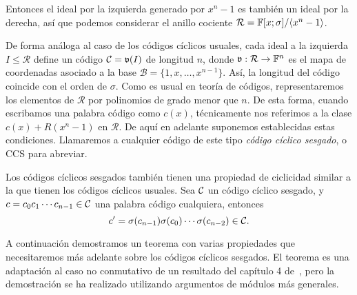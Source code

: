 Entonces el ideal por la izquierda generado por \(x^{n} - 1\) es también un ideal por la derecha, así que podemos considerar el anillo cociente \(\mathcal{R} = \mathbb{F}[x;\sigma] / \langle x^n -1 \rangle\).

De forma análoga al caso de los códigos cíclicos usuales, cada ideal a la izquierda \(I \leq \mathcal{R}\) define un código \(\mathcal{C} =\mathfrak{v}(I)\) de longitud  \(n\), donde \(\mathfrak{v}:\mathcal{R} \rightarrow \mathbb{F}^n\) es el mapa de coordenadas asociado a la base \(\mathcal{B} = \{1, x, \dots, x^{n-1}\}\). Así, la longitud del código coincide con el orden de \(\sigma\). Como es usual en teoría de códigos, representaremos los elementos de \(\mathcal{R}\) por polinomios de grado menor que \(n\). De esta forma, cuando escribamos una palabra código como \(c(x)\), técnicamente nos referimos a la clase  \(c(x) + R(x^{n} - 1)\) en \( \mathcal{R}\). De aquí en adelante suponemos establecidas estas condiciones. Llamaremos a cualquier código de este tipo \textit{código cíclico sesgado}, o CCS para abreviar.

Los códigos cíclicos sesgados también tienen una propiedad de ciclicidad similar a la que tienen los códigos cíclicos usuales. Sea \(\mathcal{C}\) un código cíclico sesgado, y  \(c = c_0 c_1\cdots c_{n-1} \in \mathcal{C}\) una palabra código cualquiera, entonces
\[c' = \sigma(c_{n-1})\sigma(c_0) \cdots \sigma(c_{n-2}) \in \mathcal{C} .\]

A continuación demostramos un teorema con varias propiedades que necesitaremos más adelante sobre los códigos cíclicos sesgados. El teorema es una adaptación al caso no conmutativo de un resultado del capítulo 4 de~\cite{foecc}, pero la demostración se ha realizado utilizando argumentos de módulos más generales.

